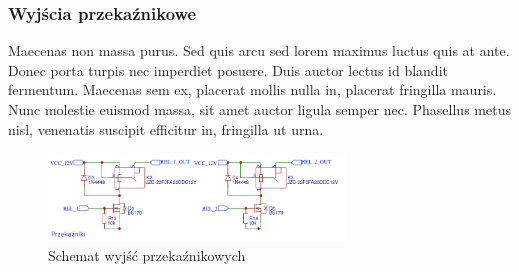 \documentclass[12pt, eng, twoside, openany, final]{mgr}
\begin{document}
            \subsubsection{Wyjścia przekaźnikowe}
            Maecenas non massa purus. Sed quis arcu sed lorem maximus luctus quis at ante. Donec porta turpis nec imperdiet posuere. Duis auctor lectus id blandit fermentum. Maecenas sem ex, placerat mollis nulla in, placerat fringilla mauris. Nunc molestie euismod massa, sit amet auctor ligula semper nec. Phasellus metus nisl, venenatis suscipit efficitur in, fringilla ut urna. 
                \begin{figure}[H]
                \begin{center}
                    \includegraphics[width=0.7\textwidth]{przekazniki.png}
                    \caption{Schemat wyjść przekaźnikowych}
                \end{center}
                \end{figure}
\end{document}

